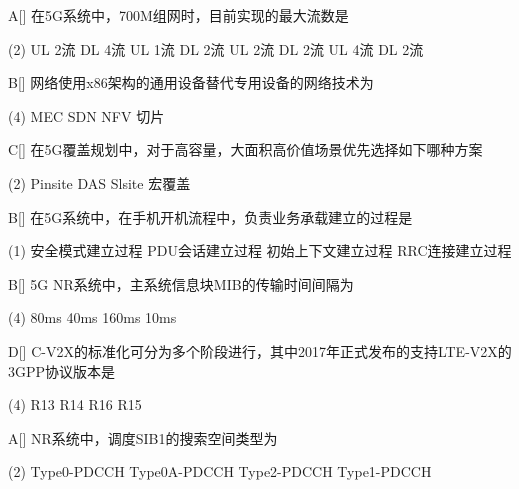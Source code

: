 \begin{choice}{A}[]
    在5G系统中，700M组网时，目前实现的最大流数是
    \begin{tasks}(2)
        \task UL 2流 DL 4流
        \task UL 1流 DL 2流
        \task UL 2流 DL 2流
        \task UL 4流 DL 2流
    \end{tasks}
\end{choice}


\begin{choice}{B}[]
    网络使用x86架构的通用设备替代专用设备的网络技术为
    \begin{tasks}(4)
        \task MEC
        \task SDN
        \task NFV
        \task 切片
    \end{tasks}
\end{choice}


\begin{choice}{C}[]
    在5G覆盖规划中，对于高容量，大面积高价值场景优先选择如下哪种方案
    \begin{tasks}(2)
        \task Pinsite
        \task DAS
        \task Slsite
        \task 宏覆盖
    \end{tasks}
\end{choice}

\begin{choice}{B}[]
    在5G系统中，在手机开机流程中，负责业务承载建立的过程是
    \begin{tasks}(1)
        \task 安全模式建立过程
        \task PDU会话建立过程
        \task 初始上下文建立过程
        \task RRC连接建立过程
    \end{tasks}
\end{choice}

\begin{choice}{B}[]
    5G NR系统中，主系统信息块MIB的传输时间间隔为
    \begin{tasks}(4)
        \task 80ms
        \task 40ms
        \task 160ms
        \task 10ms
    \end{tasks}
\end{choice}



\begin{choice}{D}[]
    C-V2X的标准化可分为多个阶段进行，其中2017年正式发布的支持LTE-V2X的3GPP协议版本是
    \begin{tasks}(4)
        \task R13
        \task R14
        \task R16
        \task R15
    \end{tasks}
\end{choice}

\begin{choice}{A}[]
    NR系统中，调度SIB1的搜索空间类型为
    \begin{tasks}(2)
        \task Type0-PDCCH
        \task Type0A-PDCCH
        \task Type2-PDCCH
        \task Type1-PDCCH
    \end{tasks}
\end{choice}


